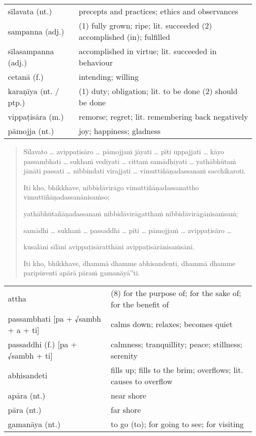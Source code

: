 \documentclass[11pt,oneside]{memoir}
\begin{document}
\begin{longtable}{L{\colOne} L{\colTwo}}
sīlavata (nt.) & precepts and practices; ethics and observances\\[0pt]
sampanna (adj.) & (1) fully grown; ripe; lit. succeeded (2) accomplished (in); fulfilled\\[0pt]
sīlasampanna (adj.) & accomplished in virtue; lit. succeeded in behaviour\\[0pt]
cetanā (f.) & intending; willing\\[0pt]
karaṇīya (nt. / ptp.) & (1) duty; obligation; lit. to be done (2) should be done\\[0pt]
vippaṭisāra (m.) & remorse; regret; lit. remembering back negatively\\[0pt]
pāmojja (nt.) & joy; happiness; gladness\\[0pt]
\end{longtable}

\begin{quote}
Sīlavato \ldots{}
avippaṭisāro \ldots{}
pāmojjaṁ jāyati \ldots{}
pīti uppajjati \ldots{}
kāyo passambhati \ldots{}
sukhaṁ vediyati \ldots{}
cittaṁ samādhiyati \ldots{}
yathābhūtaṁ jānāti passati \ldots{}
nibbindati virajjati \ldots{}
vimuttiñāṇadassanaṁ sacchikaroti.

Iti kho, bhikkhave, nibbidāvirāgo vimuttiñāṇadassanattho vimuttiñāṇadassanānisaṁso;

yathābhūtañāṇadassanaṁ nibbidāvirāgatthaṁ nibbidāvirāgānisaṁsaṁ;

samādhi \ldots{} sukhaṁ \ldots{} passaddhi \ldots{} pīti \ldots{} pāmojjaṁ \ldots{} avippaṭisāro \ldots{}

kusalāni sīlāni avippaṭisāratthāni avippaṭisārānisaṁsāni.

Iti kho, bhikkhave, dhammā dhamme abhisandenti, dhammā dhamme paripūrenti apārā pāraṁ gamanāyā”ti.
\end{quote}

\begin{longtable}{L{\colOne} L{\colTwo}}
attha & (8) for the purpose of; for the sake of; for the benefit of\\[0pt]
passambhati [pa + √sambh + a + ti] & calms down; relaxes; becomes quiet\\[0pt]
passaddhi (f.) [pa + √sambh + ti] & calmness; tranquillity; peace; stillness; serenity\\[0pt]
abhisandeti & fills up; fills to the brim; overflows; lit. causes to overflow\\[0pt]
apāra (nt.) & near shore\\[0pt]
pāra (nt.) & far shore\\[0pt]
gamanāya (nt.) & to go (to); for going to see; for visiting\\[0pt]
\end{longtable}
\end{document}
